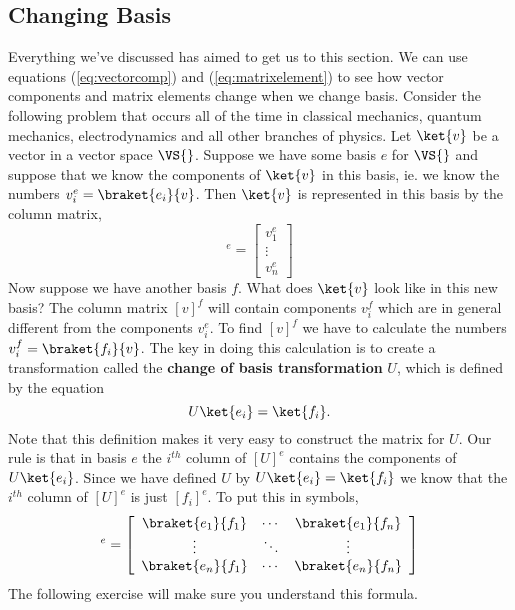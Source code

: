 \subsection{Changing Basis}
Everything we've discussed has aimed to get us to this section.  We can use equations (\ref{eq:vectorcomp}) and (\ref{eq:matrixelement}) to see how vector components and matrix elements change when we change basis.  Consider the following problem that occurs all of the time in classical mechanics, quantum mechanics, electrodynamics and all other branches of physics.  Let $\ket{v}$ be a vector in a vector space $\VS{}$.  Suppose we have some basis $e$ for $\VS{}$ and suppose that we know the components of $\ket{v}$ in this basis, ie. we know the numbers $v^e_i = \braket{e_i}{v}$.  Then $\ket{v}$ is represented in this basis by the column matrix,
\begin{displaymath}
[v]^e = \left[ \begin{array}{c} v^e_1 \\ \vdots \\ v^e_n \end{array} \right] \end{displaymath}
Now suppose we have another basis $f$.  What does $\ket{v}$ look like in this new basis?  The column matrix $[v]^f$ will contain components $v_i^f$ which are in general different from the components $v_i^e$.  To find $[v]^f$ we have to calculate the numbers $v^f_i = \braket{f_i}{v}$.  The key in doing this calculation is to create a transformation called the \textbf{change of basis transformation} $U$, which is defined by the equation
\begin{displaymath} U\ket{e_i} = \ket{f_i}. \end{displaymath}
Note that this definition makes it very easy to construct the matrix for $U$.  Our rule is that in basis $e$ the $i^{th}$ column of $[U]^e$ contains the components of $U\ket{e_i}$.  Since we have defined $U$ by $U\ket{e_i} = \ket{f_i}$ we know that the $i^{th}$ column of $[U]^e$ is just $[f_i]^e$. To put this in symbols,
\begin{displaymath}
[U]^e = \left[ \begin{array}{ccc} \braket{e_1}{f_1} & \cdots & \braket{e_1}{f_n} \\ \vdots & \ddots & \vdots \\ \braket{e_n}{f_1} & \cdots & \braket{e_n}{f_n} \end{array} \right]
\end{displaymath}
The following exercise will make sure you understand this formula.

